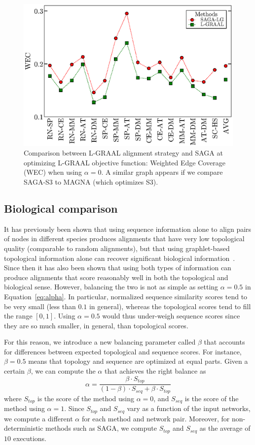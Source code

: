 \documentclass{bioinfo}
\begin{document}
\begin{figure}
\centering
\includegraphics[width=0.99\linewidth]{lgraalobjfuncomparison_bw.eps}
\caption{Comparison between L-GRAAL alignment strategy and SAGA at optimizing L-GRAAL objective function: Weighted Edge Coverage (WEC) when using $\alpha=0$. A similar graph appears if we compare SAGA-S3 to MAGNA (which optimizes S3).}
\label{fig:lgraalobjfuncomparison}
\end{figure}

\subsection{Biological comparison}\label{bio}

It has previously been shown that using sequence information alone to align pairs of nodes in different species produces alignments that have very low topological quality (comparable to random alignments), but that using graphlet-based topological information alone can recover significant biological information~\citep{GRAAL}. Since then it has also been shown that using both types of information can produce alignments that score reasonably well in both the topological and biological sense. However, balancing the two is not as simple as setting $\alpha=0.5$ in Equation~\ref{eq:alpha}. In particular, normalized sequence similarity scores tend to be very small (less than $0.1$ in general), whereas the topological scores tend to fill the range $[0,1]$. Using $\alpha=0.5$ would thus under-weigh sequence scores since they are so much smaller, in general, than topological scores.

For this reason, we introduce a new balancing parameter called $\beta$ that accounts for differences between expected topological and sequence scores. For instance, $\beta=0.5$ means that topology and sequence are optimized at equal parts. Given a certain $\beta$, we can compute the $\alpha$ that achieves the right balance as
$$\alpha = \frac{\beta\cdot S_{top}}{(1-\beta)\cdot S_{seq}+\beta\cdot S_{top}}$$
where $S_{top}$ is the score of the method using $\alpha=0$, and $S_{seq}$ is the score of the method using $\alpha=1$. Since $S_{top}$ and $S_{seq}$ vary as a function of the input networks, we compute a different $\alpha$ for each method and network pair. Moreover, for non-deterministic methods such as SAGA, we compute $S_{top}$ and $S_{seq}$ as the average of $10$ executions.
\end{document}
